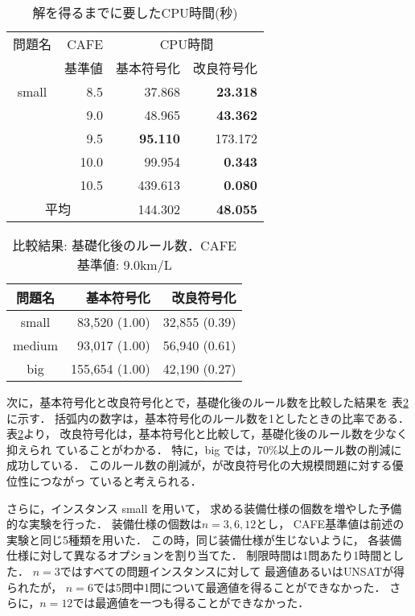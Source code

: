 \begin{table}[tbp]
 \caption{解を得るまでに要したCPU時間(秒)}
 \centering
 \begin{tabular}{c|r|rr}\bhline
  問題名 & CAFE  & \multicolumn{2}{c}{CPU時間} \\ \cline{3-4}   
        & 基準値 & 基本符号化  & 改良符号化 \\ \hline
  small & 8.5  & 37.868          & \textbf{23.318}   \\
  	& 9.0  & 48.965          & \textbf{43.362}   \\
  	& 9.5  & \textbf{95.110} & 173.172           \\
  	& 10.0 & 99.954          & \textbf{0.343}    \\
  	& 10.5 & 439.613         & \textbf{0.080}    \\ \hline \hline
  \multicolumn{2}{c}{平均}  & 144.302         & \textbf{48.055}   \\ \hline
 \end{tabular}
 \label{tab:cpu_time}
\end{table}
\begin{table}[tb]
 \caption{比較結果: 基礎化後のルール数．CAFE基準値: 9.0km/L}
 \centering
 \begin{tabular}{crr} \bhline
  問題名    & 基本符号化    & 改良符号化    \\ \hline
  small	    &  83,520 (1.00)  & 32,855 (0.39) \\ 
  medium    &  93,017 (1.00)  & 56,940 (0.61) \\
  big	    & 155,654 (1.00)  & 42,190 (0.27) \\ \hline
 \end{tabular}
 \label{tab:rule}
\end{table}

次に，基本符号化と改良符号化とで，基礎化後のルール数を比較した結果を
表\ref{tab:rule}に示す．
括弧内の数字は，基本符号化のルール数を1としたときの比率である．
表\ref{tab:rule}より，
改良符号化は，基本符号化と比較して，基礎化後のルール数を少なく抑えられ
ていることがわかる．
特に，big では，70\%以上のルール数の削減に成功している．
このルール数の削減が，が改良符号化の大規模問題に対する優位性につながっ
ていると考えられる．

さらに，インスタンス small を用いて，
求める装備仕様の個数を増やした予備的な実験を行った．
装備仕様の個数は$n=3, 6, 12$とし，
CAFE基準値は前述の実験と同じ5種類を用いた．
この時，同じ装備仕様が生じないように，
各装備仕様に対して異なるオプションを割り当てた．
制限時間は1問あたり1時間とした．
$n=3$ではすべての問題インスタンスに対して
最適値あるいは\textsf{UNSAT}が得られたが，
$n=6$では5問中1問について最適値を得ることができなかった．
さらに，$n=12$では最適値を一つも得ることができなかった．



